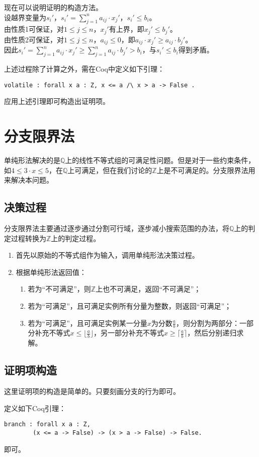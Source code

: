 现在可以说明证明的构造方法。\\
设越界变量为$s_i'$，$s_i' = \sum_{j=1}^{n} a_{ij} \cdot x_j'$，$s_i' \leq b_i$。\\
由性质1可保证，对$1 \leq j \leq n$，$x_j'$有上界，即$x_j' \leq b_j'$。\\
由性质2可保证，对$1 \leq j \leq n$，$a_{ij} \leq 0$，即$a_{ij} \cdot x_j' \geq a_{ij} \cdot b_j'$。\\
因此$s_i' = \sum_{j=1}^{n} a_{ij} \cdot x_j' \geq \sum_{j=1}^{n} a_{ij} \cdot b_j' > b_i$，与$s_i' \leq b_i$得到矛盾。

上述过程除了计算之外，需在Coq中定义如下引理：
\begin{verbatim}
volatile : forall x a : Z, x <= a /\ x > a -> False .
\end{verbatim}
应用上述引理即可构造出证明项。

\section{分支限界法}
单纯形法解决的是$\mathbb{Q}$上的线性不等式组的可满足性问题。但是对于一些约束条件，如$4 \leq 3 \cdot x \leq 5$，在$\mathbb{Q}$上可满足，但在我们讨论的$\mathbb{Z}$上是不可满足的。分支限界法用来解决本问题。
\subsection{决策过程}
分支限界法主要通过逐步通过分割可行域，逐步减小搜索范围的办法，将$\mathbb{Q}$上的判定过程转换为$\mathbb{Z}$上的判定过程。
\begin{enumerate}
  \item 首先以原始的不等式组作为输入，调用单纯形法决策过程。
  \item 根据单纯形法返回值：
    \begin{enumerate}
      \item 若为``不可满足''，则$\mathbb{Z}$上也不可满足，返回``不可满足''；
      \item 若为``可满足''，且可满足实例所有分量为整数，则返回``可满足''；
      \item 若为``可满足''，且可满足实例某一分量$x$为分数$\frac{a}{b}$，则分割为两部分：一部分补充不等式$x \leq \lfloor \frac{a}{b} \rfloor$，另一部分补充不等式$x \geq \lceil \frac{a}{b} \rceil$，然后分别递归求解。
    \end{enumerate}
\end{enumerate}

\subsection{证明项构造}
这里证明项的构造是简单的。只要刻画分支的行为即可。

定义如下Coq引理：
\begin{verbatim}
branch : forall x a : Z,
        (x <= a -> False) -> (x > a -> False) -> False.
\end{verbatim}
即可。

